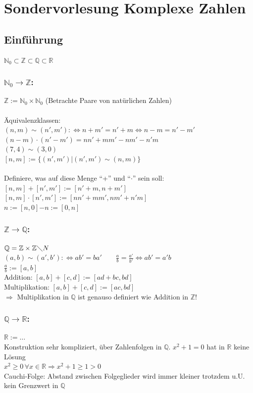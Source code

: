 \section{Sondervorlesung Komplexe Zahlen}
%
%
%
\subsection{Einführung}
$\mathbb{N}_{0}\subset\mathbb{Z}\subset\mathbb{Q}\subset\mathbb{R}$
%
%
%
\subsubsection{$\mathbb{N}_{0}\rightarrow\mathbb{Z}$:}
$\mathbb{Z}:=\mathbb{N}_{0}\times\mathbb{N}_{0}$ (Betrachte Paare von natürlichen Zahlen)\\
\qquad\\
Äquivalenzklassen:\\
$(n,m)\sim(n',m'):\Leftrightarrow n+m' = n'+m \Leftrightarrow n-m=n'-m'$\\
$(n-m)\cdot(n'-m')=nn'+mm'-nm'-n'm$\\
$(7,4)\sim(3,0)$\\
$[n,m]:=\{(n',m')|(n',m')\sim(n,m)\}$\\
\qquad\\
Definiere, was auf diese Menge "`+"' und "`$\cdot$"' sein soll:\\
$[n,m]+[n',m']:=[n'+m,n+m']$\\
$[n,m]\cdot[n',m']:=[nn'+mm',nm'+n'm]$\\
$n:=[n,0]$\qquad $-n:=[0,n]$
%
%
%
\subsubsection{$\mathbb{Z}\rightarrow\mathbb{Q}$:}
$\mathbb{Q}=\mathbb{Z}\times\mathbb{Z}\diagdown N$\\
$(a,b)\sim(a',b'):\Leftrightarrow ab'=ba' \qquad \frac{a}{b}=\frac{a'}{b'}\Leftrightarrow ab'=a'b$\\
$\frac{a}{b}:=[a,b]$\\
Addition: $[a,b]+[c,d]:=[ad+bc,bd]$\\
Multiplikation: $[a,b]+[c,d]:=[ac,bd]$\\
$\Rightarrow$ Multiplikation in $\mathbb{Q}$ ist genauso definiert wie Addition in $\mathbb{Z}$!
%
%
%
\subsubsection{$\mathbb{Q}\rightarrow\mathbb{R}$:}
$\mathbb{R}:=\dotsc$\\
Konstruktion sehr kompliziert, über Zahlenfolgen in $\mathbb{Q}$.
$x^{2}+1=0$ hat in $\mathbb{R}$ keine Lösung\\
$x^{2}\geq0 \, \forall x\in \mathbb{R}\Rightarrow x^{2}+1\geq1>0$\\
Cauchi-Folge: Abstand zwischen Folgeglieder wird immer kleiner trotzdem u.U. kein Grenzwert in $\mathbb{Q}$
%
%
%

